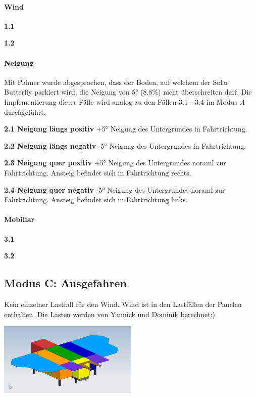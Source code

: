 \paragraph{Wind}
\begin{description}
  \item \textbf{1.1 }
  \item \textbf{1.2 }
\end{description}

\paragraph{Neigung}
Mit Palmer wurde abgesprochen, dass der Boden, auf welchem der Solar Butterfly parkiert wird, die Neigung von 5° (8.8\%) nicht überschreiten darf. Die Implementierung dieser Fälle wird analog zu den Fällen 3.1 - 3.4 im Modus \emph{A} durchgeführt.
\begin{description}
  \item \textbf{2.1 Neigung längs positiv} +5° Neigung des Untergrundes in Fahrtrichtung.
  \item \textbf{2.2 Neigung längs negativ} -5° Neigung des Untergrundes in Fahrtrichtung.
  \item \textbf{2.3 Neigung quer positiv} +5° Neigung des Untergrundes noraml zur Fahrtrichtung. Ansteig befindet sich in Fahrtrichtung rechts.
  \item \textbf{2.4 Neigung quer negativ} -5° Neigung des Untergrundes noraml zur Fahrtrichtung. Ansteig befindet sich in Fahrtrichtung links.
\end{description}

\paragraph{Mobiliar}
\begin{description}
  \item \textbf{3.1 }
  \item \textbf{3.2 }
\end{description}


\subsection{Modus C: Ausgefahren}
Kein einzelner Lastfall für den Wind. Wind ist in den Lastfällen der Panelen enthalten. Die Lasten werden von Yannick und Dominik berechnet:)\\

\begin{center}
  \includegraphics[width=0.5\textwidth]{04_Figures/C.png}
  \label{Modus C}
\end{center}

